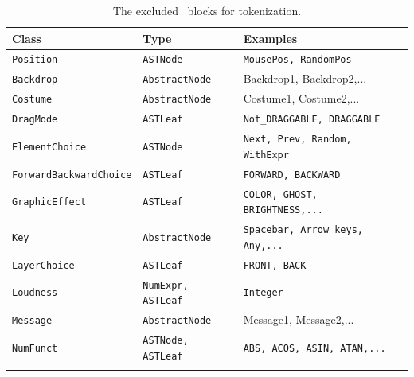 \begin{table}[H]
    \caption[The excluded \scratch\ blocks]{\label{tab:excluded-blocks}The excluded \scratch\ blocks for tokenization.}

    \begin{tabular}[t]{lll}
    	\toprule
    	Class & Type & Examples \\
    	\midrule
    	\vspace{10pt}
    		\texttt{Position} & \texttt{ASTNode} & \texttt{MousePos, RandomPos} \\
    		\vspace{10pt} 
    		\texttt{Backdrop} & \texttt{AbstractNode} & Backdrop1, Backdrop2,... \\
    		\vspace{10pt} 
    		\texttt{Costume} & \texttt{AbstractNode} & Costume1, Costume2,... \\
    		\vspace{10pt}
    		\texttt{DragMode} & \texttt{ASTLeaf} & \texttt{Not\_DRAGGABLE, DRAGGABLE} \\
    		\vspace{10pt}
   		\texttt{ElementChoice} & \texttt{ASTNode} & \texttt{Next, Prev, Random, WithExpr} \\
   		\vspace{10pt}
    		\texttt{ForwardBackwardChoice} & \texttt{ASTLeaf} & \texttt{FORWARD, BACKWARD} \\
    		\vspace{10pt}
    		\texttt{GraphicEffect} & \texttt{ASTLeaf} & \texttt{COLOR, GHOST, BRIGHTNESS,...} \\
    		\vspace{10pt}
    		\texttt{Key} & \texttt{AbstractNode} & \texttt{Spacebar, Arrow keys, Any,...} \\
    		\vspace{10pt} 
   	 	\texttt{LayerChoice} & \texttt{ASTLeaf} & \texttt{FRONT, BACK} \\ 
   	 	\vspace{10pt}
    		\texttt{Loudness} & \texttt{NumExpr, ASTLeaf} & \texttt{Integer} \\
    		\vspace{10pt}
   		\texttt{Message} & \texttt{AbstractNode} & Message1, Message2,... \\
   		\vspace{10pt}
    		\texttt{NumFunct} & \texttt{ASTNode, ASTLeaf} & \texttt{ABS, ACOS, ASIN, ATAN,...} \\
    		\vspace{10pt} 

\end{tabular}
\end{table}
